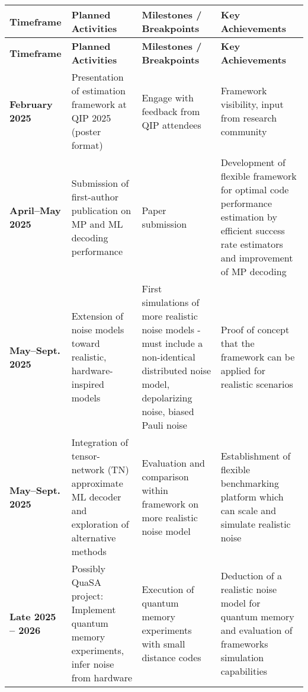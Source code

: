 \documentclass[11pt,a4paper]{article}
\begin{document}
\renewcommand{\arraystretch}{1.6}
\begin{longtable}{p{3cm} | p{4.5cm} | p{4cm} | p{4.5cm}}
\textbf{Timeframe} & \textbf{Planned Activities} & \textbf{Milestones / Breakpoints} & \textbf{Key Achievements} \\
\hline
\endfirsthead
\textbf{Timeframe} & \textbf{Planned Activities} & \textbf{Milestones / Breakpoints} & \textbf{Key Achievements} \\
\hline
\endhead

\textbf{February 2025} & Presentation of estimation framework at QIP 2025 (poster format) & Engage with feedback from QIP attendees & Framework visibility, input from research community \\

\textbf{April–May 2025} & Submission of first-author publication on MP and ML decoding performance & Paper submission & Development of flexible framework for optimal code performance estimation by efficient success rate estimators and improvement of MP decoding \\

\textbf{May–Sept. 2025} & Extension of noise models toward realistic, hardware-inspired models & First simulations of more realistic noise models - must include a non-identical distributed noise model, depolarizing noise, biased Pauli noise & Proof of concept that the framework can be applied for realistic scenarios \\

\textbf{May–Sept. 2025} & Integration of tensor-network (TN) approximate ML decoder and exploration of alternative methods & Evaluation and comparison within framework on more realistic noise model & Establishment of flexible benchmarking platform which can scale and simulate realistic noise \\

\textbf{Late 2025 – 2026} & Possibly QuaSA project: Implement quantum memory experiments, infer noise from hardware & Execution of quantum memory experiments with small distance codes & Deduction of a realistic noise model for quantum memory and evaluation of frameworks simulation capabilities \\

\end{longtable}
\end{document}
